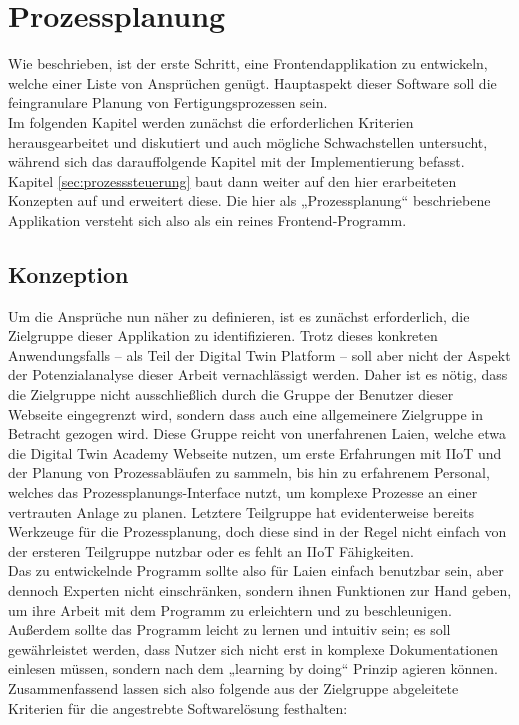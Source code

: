 \section{Prozessplanung}
\label{sec:prozessplanung}

Wie beschrieben, ist der erste Schritt, eine Frontendapplikation zu entwickeln, welche einer Liste von Ansprüchen genügt. Hauptaspekt dieser Software soll die feingranulare Planung von Fertigungsprozessen sein.\\
Im folgenden Kapitel werden zunächst die erforderlichen Kriterien herausgearbeitet und diskutiert und auch mögliche Schwachstellen untersucht, während sich das darauffolgende Kapitel mit der Implementierung befasst. Kapitel \ref{sec:prozesssteuerung} baut dann weiter auf den hier erarbeiteten Konzepten auf und erweitert diese. Die hier als „Prozessplanung“ beschriebene Applikation versteht sich also als ein reines Frontend-Programm.

\subsection*{Konzeption}
\label{subsec:prozessplanung_konzeption}

Um die Ansprüche nun näher zu definieren, ist es zunächst erforderlich, die Zielgruppe dieser Applikation zu identifizieren. Trotz dieses konkreten Anwendungsfalls – als Teil der Digital Twin Platform – soll aber nicht der Aspekt der Potenzialanalyse dieser Arbeit vernachlässigt werden. Daher ist es nötig, dass die Zielgruppe nicht ausschließlich durch die Gruppe der Benutzer dieser Webseite eingegrenzt wird, sondern dass auch eine allgemeinere Zielgruppe in Betracht gezogen wird. Diese Gruppe reicht von unerfahrenen Laien, welche etwa die Digital Twin Academy Webseite nutzen, um erste Erfahrungen mit IIoT und der Planung von Prozessabläufen zu sammeln, bis hin zu erfahrenem Personal, welches das Prozessplanungs-Interface nutzt, um komplexe Prozesse an einer vertrauten Anlage zu planen. Letztere Teilgruppe hat evidenterweise bereits Werkzeuge für die Prozessplanung, doch diese sind in der Regel nicht einfach von der ersteren Teilgruppe nutzbar oder es fehlt an IIoT Fähigkeiten.\\
Das zu entwickelnde Programm sollte also für Laien einfach benutzbar sein, aber dennoch Experten nicht einschränken, sondern ihnen Funktionen zur Hand geben, um ihre Arbeit mit dem Programm zu erleichtern und zu beschleunigen. Außerdem sollte das Programm leicht zu lernen und intuitiv sein; es soll gewährleistet werden, dass Nutzer sich nicht erst in komplexe Dokumentationen einlesen müssen, sondern nach dem „learning by doing“ Prinzip agieren können.\\
Zusammenfassend lassen sich also folgende aus der Zielgruppe abgeleitete Kriterien für die angestrebte Softwarelösung festhalten:

